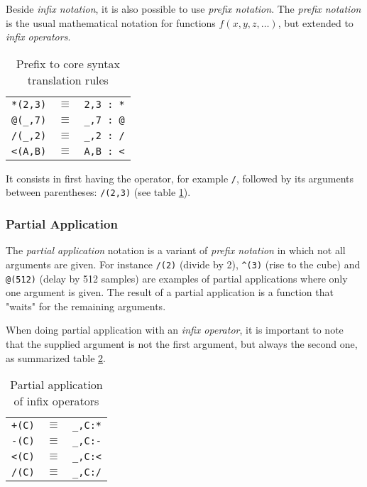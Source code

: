 Beside \emph{infix notation}, it is also possible to use \emph{prefix notation}. 
The \emph{prefix notation} is the usual mathematical notation for functions $f(x,y,z,\ldots)$, but extended to \emph{infix operators}. 
%
\begin{table}[h!]
	\begin{center}
	\begin{tabular}{|rcl|}
	\hline
	\lstinline'*(2,3)' & $\equiv$ & \lstinline'2,3 : *'\\
	\lstinline'@(_,7)' & $\equiv$ & \lstinline'_,7 : @'\\
	\lstinline'/(_,2)' & $\equiv$ & \lstinline'_,2 : /'\\
	\lstinline'<(A,B)' & $\equiv$ & \lstinline'A,B : <'\\
	\hline
	\end{tabular}
	\end{center}
	\caption{Prefix to core syntax translation rules}
	\label{tab-prefixrules}
\end{table}

It consists in first having the operator, for example \lstinline'/', followed by its arguments between parentheses: \lstinline'/(2,3)' (see table \ref{tab-prefixrules}). 

\subsubsection{Partial Application}

The \emph{partial application} notation is a variant of \emph{prefix notation} in which not all arguments are given. For instance  \lstinline'/(2)' (divide by 2), \lstinline'^(3)'  (rise to the cube) and \lstinline'@(512)' (delay by 512 samples) are examples of partial applications where only one argument is given. The result of a partial application is a function that "waits" for the remaining arguments. 

When doing partial application with an \emph{infix operator}, it is important to note that the supplied argument is not the first argument, but always the second one, as summarized table \ref{tab-partialrules}. 


\begin{table}[h]
	\begin{center}
	\begin{tabular}{|rcl|}
	\hline
	\lstinline'+(C)' & $\equiv$ & \lstinline'_,C:*'\\
	\lstinline'-(C)' & $\equiv$ & \lstinline'_,C:-'\\
	\lstinline'<(C)' & $\equiv$ & \lstinline'_,C:<'\\
	\lstinline'/(C)' & $\equiv$ & \lstinline'_,C:/'\\
	\hline
	\end{tabular}
	\end{center}
	\caption{Partial application of infix operators}
	\label{tab-partialrules}
	
\end{table}

